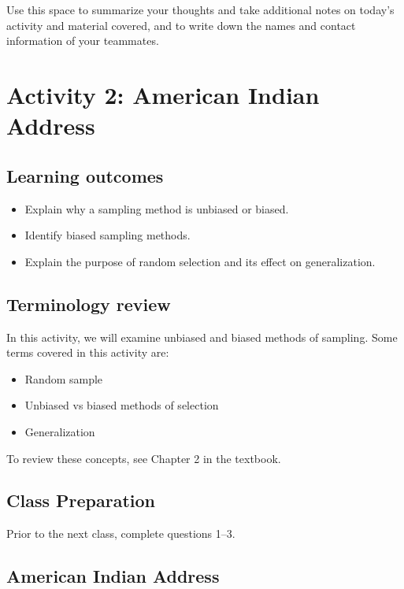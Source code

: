 \documentclass[
]{report}
\begin{document}
Use this space to summarize your thoughts and take additional notes on today's activity and material covered, and to write down the names and contact information of your teammates.

\newpage

\section{Activity 2: American Indian Address}\label{activity-2-american-indian-address}


\subsection{Learning outcomes}\label{learning-outcomes-1}

\begin{itemize}
\item
  Explain why a sampling method is unbiased or biased.
\item
  Identify biased sampling methods.
\item
  Explain the purpose of random selection and its effect on generalization.
\end{itemize}

\subsection{Terminology review}\label{terminology-review-1}

In this activity, we will examine unbiased and biased methods of sampling. Some terms covered in this activity are:

\begin{itemize}
\item
  Random sample
\item
  Unbiased vs biased methods of selection
\item
  Generalization
\end{itemize}

To review these concepts, see Chapter 2 in the textbook.

\subsection{Class Preparation}\label{class-preparation}

Prior to the next class, complete questions 1--3.

\subsection{American Indian Address}\label{american-indian-address}
\end{document}
